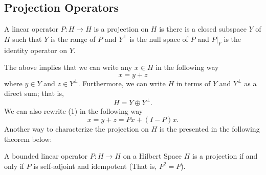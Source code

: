 \subsection{Projection Operators}

\begin{prop}
    A linear operator \( P : H \to H  \) is a projection on \( H  \) is there is a closed subspace \( Y  \) of \( H  \) such that \( Y  \) is the range of \( P  \) and \( Y^{\perp} \) is the null space of \( P \) and \( P |_{Y} \) is the identity operator on \( Y  \).
\end{prop}
The above implies that we can write any \( x \in H  \) in the following way
\[  x = y + z  \tag{1} \]
where \( y \in Y  \) and \( z \in Y^{\perp} \). Furthermore, we can write \( H  \) in terms of \( Y  \) and \( Y^{\perp} \) as a direct sum; that is,
\[  H = Y \oplus Y^{\perp}. \]
We can also rewrite (1) in the following way
\[  x = y + z = Px + (I-P)x. \]
Another way to characterize the projection on \( H  \) is the presented in the following theorem below:

\begin{theorem}\label{9.5-1}
    A bounded linear operator \( P: H \to H  \) on a Hilbert Space \( H  \) is a projection if and only if \( P  \) is self-adjoint and idempotent (That is, \( P^{2} = P  \)).
\end{theorem}




